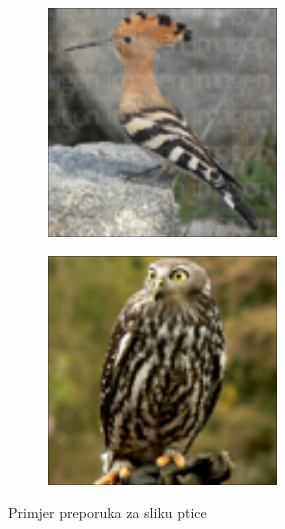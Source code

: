 \documentclass[times, utf8, proizvoljni, numeric]{fer}
\begin{document}
\begin{figure}[ht!]
\begin{subfigure}[t]{0.24\textwidth}
	\end{subfigure}
	\begin{subfigure}[t]{0.24\textwidth}
		\includegraphics[width=\textwidth,height=\textwidth]{./imgs/demo-preporucitelja-po-sadrzaju/tijek-rada/id@1745.png}
	\end{subfigure}
	\begin{subfigure}[t]{0.24\textwidth}
		\includegraphics[width=\textwidth,height=\textwidth]{./imgs/demo-preporucitelja-po-sadrzaju/tijek-rada/id@2530.png}
	\end{subfigure}
	\caption{Primjer preporuka za sliku ptice}
	\label{fg:demo_bird}			
\end{figure}
\end{document}
